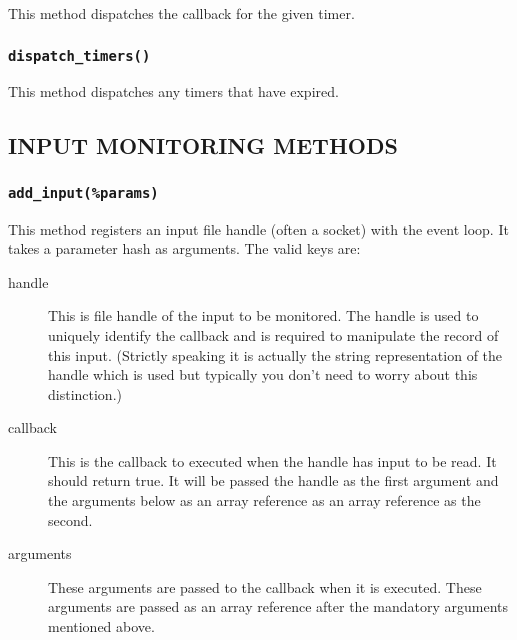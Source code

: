 This method dispatches the callback for the given timer.

\subsubsection*{\texttt{dispatch\_timers()}\label{xPL::Listener_dispatch_timers_}}


This method dispatches any timers that have expired.

\subsection*{INPUT MONITORING METHODS\label{xPL::Listener_INPUT_MONITORING_METHODS}}
\subsubsection*{\texttt{add\_input(\%params)}\label{xPL::Listener_add_input_params_}}


This method registers an input file handle (often a socket) with the
event loop.  It takes a parameter hash as arguments.  The valid keys
are:

\begin{description}

\item[{handle}] \mbox{}

This is file handle of the input to be monitored.  The handle is
used to uniquely identify the callback and is required to manipulate
the record of this input.  (Strictly speaking it is actually the
string representation of the handle which is used but typically
you don't need to worry about this distinction.)


\item[{callback}] \mbox{}

This is the callback to executed when the handle has input to be read.
It should return true.  It will be passed the handle as the first
argument and the arguments below as an array reference as an array
reference as the second.


\item[{arguments}] \mbox{}

These arguments are passed to the callback when it is executed.  These
arguments are passed as an array reference after the mandatory
arguments mentioned above.

\end{description}
